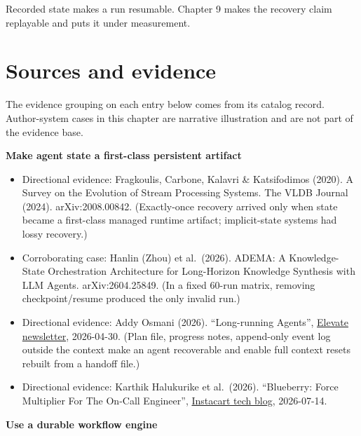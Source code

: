 Recorded state makes a run resumable. Chapter 9 makes the recovery claim replayable and puts it under measurement.

\section*{Sources and evidence}

The evidence grouping on each entry below comes from its catalog record. Author-system cases in this chapter are narrative illustration and are not part of the evidence base.

\textbf{Make agent state a first-class persistent artifact}

\begin{itemize}
\tightlist
\item
  Directional evidence: Fragkoulis, Carbone, Kalavri \& Katsifodimos (2020). A Survey on the Evolution of Stream Processing Systems. The VLDB Journal (2024). arXiv:2008.00842. (Exactly-once recovery arrived only when state became a first-class managed runtime artifact; implicit-state systems had lossy recovery.)
\item
  Corroborating case: Hanlin (Zhou) et al.~(2026). ADEMA: A Knowledge-State Orchestration Architecture for Long-Horizon Knowledge Synthesis with LLM Agents. arXiv:2604.25849. (In a fixed 60-run matrix, removing checkpoint/resume produced the only invalid run.)
\item
  Directional evidence: Addy Osmani (2026). ``Long-running Agents'', \href{https://addyo.substack.com/p/long-running-agents}{Elevate newsletter}, 2026-04-30. (Plan file, progress notes, append-only event log outside the context make an agent recoverable and enable full context resets rebuilt from a handoff file.)
\item
  Directional evidence: Karthik Halukurike et al.~(2026). ``Blueberry: Force Multiplier For The On-Call Engineer'', \href{https://tech.instacart.com/blueberry-force-multiplier-for-the-on-call-engineer-98c446dfcc12}{Instacart tech blog}, 2026-07-14.
\end{itemize}

\textbf{Use a durable workflow engine}


